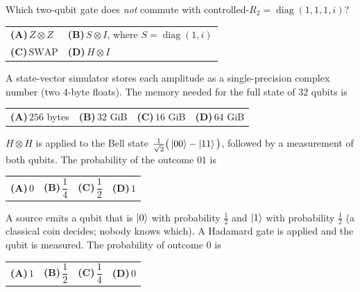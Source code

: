 \documentclass[11pt,a4paper]{article}
\newcommand{\optlabel}[1]{\textbf{(#1)}}
\newenvironment{qitem}[1]{\begin{list}{}{\setlength{\leftmargin}{3.3em}\setlength{\labelwidth}{3.1em}%
  \setlength{\labelsep}{0.2em}\setlength{\topsep}{3pt}\setlength{\parsep}{3pt}}\item[\textbf{Q.#1}\hfill]}{\end{list}}
\newcommand{\qsep}{\par\vspace{2pt}{\color{black!15}\hrule}\vspace{4pt}}
\begin{document}
\begin{qitem}{31}
Which two-qubit gate does \emph{not} commute with controlled-$R_2 = \operatorname{diag}(1, 1, 1, i)$?
\par\smallskip\noindent\begin{tabularx}{\linewidth}{@{}*{2}{L}@{}}
\optlabel{A}\,$Z\otimes Z$ & \optlabel{B}\,$S\otimes I$, where $S = \operatorname{diag}(1, i)$ \\[3pt]
\optlabel{C}\,$\mathrm{SWAP}$ & \optlabel{D}\,$H\otimes I$
\end{tabularx}
\end{qitem}
\qsep

\begin{qitem}{32}
A state-vector simulator stores each amplitude as a single-precision complex number (two 4-byte floats).
The memory needed for the full state of $32$ qubits is
\par\smallskip\noindent\begin{tabularx}{\linewidth}{@{}*{4}{L}@{}}
\optlabel{A}\,$256$ bytes & \optlabel{B}\,$32$ GiB & \optlabel{C}\,$16$ GiB & \optlabel{D}\,$64$ GiB
\end{tabularx}
\end{qitem}
\qsep

\begin{qitem}{33}
$H\otimes H$ is applied to the Bell state $\frac{1}{\sqrt2}\big(\ket{00} - \ket{11}\big)$, followed by a measurement of both
qubits. The probability of the outcome $01$ is
\par\smallskip\noindent\begin{tabularx}{\linewidth}{@{}*{4}{L}@{}}
\optlabel{A}\,$0$ & \optlabel{B}\,$\dfrac14$ & \optlabel{C}\,$\dfrac12$ & \optlabel{D}\,$1$
\end{tabularx}
\end{qitem}
\qsep

\begin{qitem}{34}
A source emits a qubit that is $\ket0$ with probability $\frac12$ and $\ket1$ with probability $\frac12$ (a classical
coin decides; nobody knows which). A Hadamard gate is applied and the qubit is measured. The probability of outcome $0$ is
\par\smallskip\noindent\begin{tabularx}{\linewidth}{@{}*{4}{L}@{}}
\optlabel{A}\,$1$ & \optlabel{B}\,$\dfrac12$ & \optlabel{C}\,$\dfrac14$ & \optlabel{D}\,$0$
\end{tabularx}
\end{qitem}
\qsep
\end{document}
